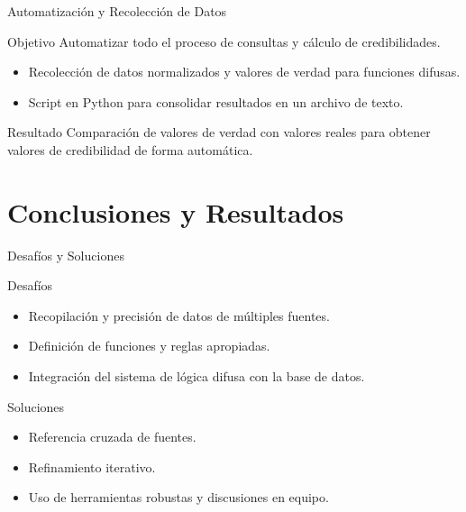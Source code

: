 \documentclass{beamer}
\newcommand{\slideauthor}[1]{\gdef\insertslideauthor{#1}}
\begin{document}
\begin{frame}{Automatización y Recolección de Datos}
\slideauthor{Francisco J. González}
    \begin{block}{Objetivo}
        Automatizar todo el proceso de consultas y cálculo de credibilidades.
    \end{block}
    \begin{itemize}
        \item Recolección de datos normalizados y valores de verdad para funciones difusas.
        \item Script en Python para consolidar resultados en un archivo de texto.
    \end{itemize}
    \begin{block}{Resultado}
        Comparación de valores de verdad con valores reales para obtener valores de credibilidad de forma automática.
    \end{block}
\end{frame}

\section{Conclusiones y Resultados}

\begin{frame}{Desafíos y Soluciones}
\slideauthor{Francisco J. González}
    \begin{block}{Desafíos}
        \begin{itemize}
            \item Recopilación y precisión de datos de múltiples fuentes.
            \item Definición de funciones y reglas apropiadas.
            \item Integración del sistema de lógica difusa con la base de datos.
        \end{itemize}
    \end{block}
    \begin{block}{Soluciones}
        \begin{itemize}
            \item Referencia cruzada de fuentes.
            \item Refinamiento iterativo.
            \item Uso de herramientas robustas y discusiones en equipo.
        \end{itemize}
    \end{block}
\end{frame}
\end{document}
